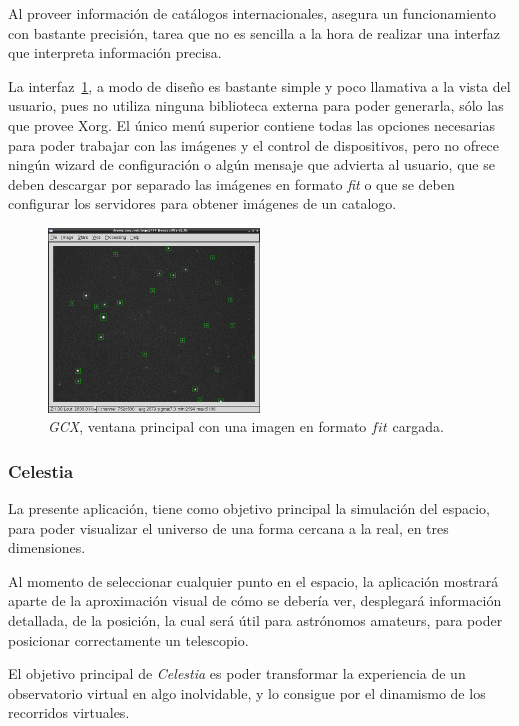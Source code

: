Al proveer información de catálogos internacionales,
asegura un funcionamiento con bastante precisión,
tarea que no es sencilla a la hora de realizar
una interfaz que interpreta información precisa.

La interfaz~\ref{fig:gcx}, a modo de diseño es bastante simple y
poco llamativa a la vista
del usuario, pues no utiliza ninguna biblioteca externa para poder
generarla, sólo las que provee Xorg.
El único menú superior contiene todas las opciones
necesarias para poder trabajar con las imágenes
y el control de dispositivos, pero no ofrece
ningún wizard de configuración o algún mensaje que advierta
al usuario, que se deben descargar por separado las imágenes
en formato \emph{fit} o que se deben configurar los servidores
para obtener imágenes de un catalogo.

\begin{figure}[!htb]
    \centering
    \includegraphics[width=0.5\textwidth]{img/gcx}
    \caption{\emph{GCX}, ventana principal con una imagen en formato $fit$ cargada.}
    \label{fig:gcx}
\end{figure}

\subsubsection{Celestia}

La presente aplicación, tiene como objetivo principal la simulación
del espacio, para poder visualizar el universo de una forma
cercana a la real, en tres dimensiones.

Al momento de seleccionar cualquier punto en el espacio,
la aplicación mostrará aparte de la aproximación visual
de cómo se debería ver, desplegará información detallada,
de la posición, la cual será útil para astrónomos amateurs,
para poder posicionar correctamente un telescopio.

El objetivo principal de \emph{Celestia}
es poder transformar la experiencia de un observatorio virtual
en algo inolvidable, y lo consigue por el dinamismo de los recorridos
virtuales.

